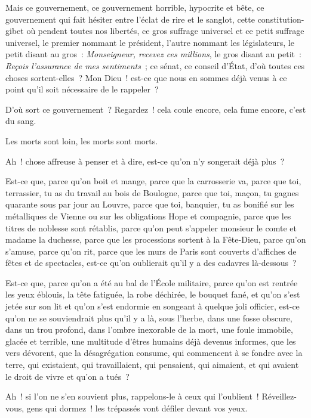 \documentclass[french,twoside]{book} %
\newcommand\chaptercont{} %
\begin{document}
\chaptercont
\noindent Mais ce gouvernement, ce gouvernement horrible, hypocrite et bête, ce gouvernement qui fait hésiter entre l’éclat de rire et le sanglot, cette constitution-gibet où pendent toutes nos libertés, ce gros suffrage universel et ce petit suffrage universel, le premier nommant le président, l’autre nommant les législateurs, le petit disant au gros : \emph{Monseigneur, recevez ces millions}, le gros disant au petit : \emph{Reçois l’assurance de mes sentiments} ; ce sénat, ce conseil d’État, d’où toutes ces choses sortent-elles ? Mon Dieu ! est-ce que nous en sommes déjà venus à ce point qu’il soit nécessaire de le rappeler ?\par
D’où sort ce gouvernement ? Regardez ! cela coule encore, cela fume encore, c’est du sang.\par
Les morts sont loin, les morts sont morts.\par
Ah ! chose affreuse à penser et à dire, est-ce qu’on n’y songerait déjà plus ?\par
Est-ce que, parce qu’on boit et mange, parce que la carrosserie va, parce que toi, terrassier, tu as du travail au bois de Boulogne, parce que toi, maçon, tu gagnes quarante sous par jour au Louvre, parce que toi, banquier, tu as bonifié sur les métalliques de Vienne ou sur les obligations Hope et compagnie, parce que les titres de noblesse sont rétablis, parce qu’on peut s’appeler monsieur le comte et madame la duchesse, parce que les processions sortent à la Fête-Dieu, parce qu’on s’amuse, parce qu’on rit, parce que les murs de Paris sont couverts d’affiches de fêtes et de spectacles, est-ce qu’on oublierait qu’il y a des cadavres là-dessous ?\par
Est-ce que, parce qu’on a été au bal de l’École militaire, parce qu’on est rentrée les yeux éblouis, la tête fatiguée, la robe déchirée, le bouquet fané, et qu’on s’est jetée sur son lit et qu’on s’est endormie en songeant à quelque joli officier, est-ce qu’on ne se souviendrait plus qu’il y a là, sous l’herbe, dans une fosse obscure, dans un trou profond, dans l’ombre inexorable de la mort, une foule immobile, glacée et terrible, une multitude d’êtres humains déjà devenus informes, que les vers dévorent, que la désagrégation consume, qui commencent à se fondre avec la terre, qui existaient, qui travaillaient, qui pensaient, qui aimaient, et qui avaient le droit de vivre et qu’on a tués ?\par
Ah ! si l’on ne s’en souvient plus, rappelons-le à ceux qui l’oublient ! Réveillez-vous, gens qui dormez ! les trépassés vont défiler devant vos yeux.\par
\end{document}
